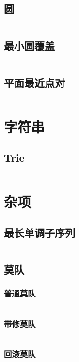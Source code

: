 \documentclass[utf8]{ctexart}
\newcommand{\cpp}[1]{\inputminted[linenos,breaklines,tabsize=4,mathescape]{c++}{#1}}
\begin{document}
\subsection{圆}
\cpp{codes/computational-geometry/circle.cpp}

\subsection{最小圆覆盖}
\cpp{codes/computational-geometry/min-circle-cover.cpp}

\subsection{平面最近点对}
\cpp{codes/computational-geometry/nearest-points.cpp}

\section{字符串}

\subsection{Trie}
\cpp{codes/string/trie.cpp}

\section{杂项}

\subsection{最长单调子序列}
\cpp{codes/misc/lis.cpp}

\subsection{莫队}

\subsubsection{普通莫队}
\cpp{codes/misc/mo.cpp}

\subsubsection{带修莫队}
\cpp{codes/misc/modifiable-mo.cpp}

\subsubsection{回滚莫队}
\cpp{codes/misc/rollback-mo.cpp}
\end{document}
